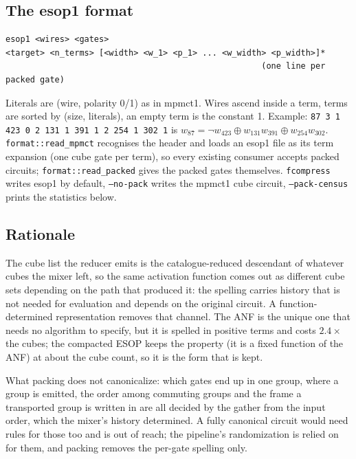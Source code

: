 \documentclass[11pt]{article}
\begin{document}
\subsection{The esop1 format}
\begin{verbatim}
esop1 <wires> <gates>
<target> <n_terms> [<width> <w_1> <p_1> ... <w_width> <p_width>]*
                                                    (one line per packed gate)
\end{verbatim}
Literals are (wire, polarity 0/1) as in mpmct1. Wires ascend inside a term, terms are sorted
by (size, literals), an empty term is the constant 1. Example:
\texttt{87 3 1 423 0 2 131 1 391 1 2 254 1 302 1} is
$w_{87} \mathrel{\hat{}}= \lnot w_{423} \oplus w_{131}w_{391} \oplus w_{254}w_{302}$.
\texttt{format::read\_mpmct} recognises the header and loads an esop1 file as its term
expansion (one cube gate per term), so every existing consumer accepts packed circuits;
\texttt{format::read\_packed} gives the packed gates themselves. \texttt{fcompress} writes
esop1 by default, \texttt{--no-pack} writes the mpmct1 cube circuit, \texttt{--pack-census}
prints the statistics below.

\subsection{Rationale}

The cube list the reducer emits is the catalogue-reduced descendant of whatever cubes the
mixer left, so the same activation function comes out as different cube sets depending on the
path that produced it: the spelling carries history that is not needed for evaluation and
depends on the original circuit. A function-determined representation removes that channel.
The ANF is the unique one that needs no algorithm to specify, but it is spelled in positive
terms and costs $2.4\times$ the cubes; the compacted ESOP keeps the property (it is a fixed
function of the ANF) at about the cube count, so it is the form that is kept.

What packing does not canonicalize: which gates end up in one group, where a group is
emitted, the order among commuting groups and the frame a transported group is written in
are all decided by the gather from the input order, which the mixer's history determined. A
fully canonical circuit would need rules for those too and is out of reach; the pipeline's
randomization is relied on for them, and packing removes the per-gate spelling only.
\end{document}
